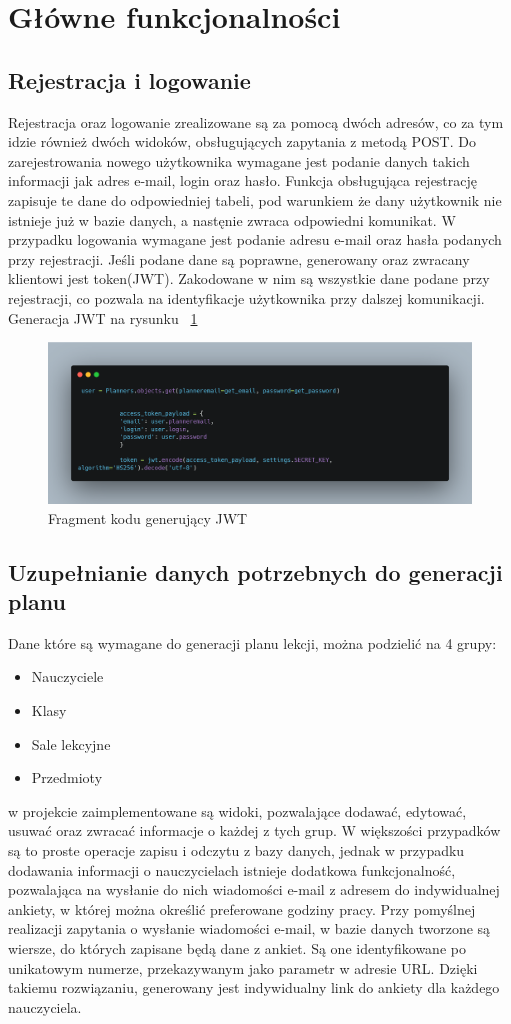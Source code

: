 \section{Główne funkcjonalności}
\subsection{Rejestracja i logowanie}
Rejestracja oraz logowanie zrealizowane są za pomocą dwóch adresów, co za tym idzie również dwóch widoków, obsługujących zapytania z metodą POST. Do zarejestrowania nowego użytkownika wymagane jest podanie danych takich informacji jak adres e-mail, login oraz hasło. Funkcja obsługująca rejestrację zapisuje te dane do odpowiedniej tabeli, pod warunkiem że dany użytkownik nie istnieje już w bazie danych, a nastęnie zwraca odpowiedni komunikat. W przypadku logowania wymagane jest podanie adresu e-mail oraz hasła podanych przy rejestracji. Jeśli podane dane są poprawne, generowany oraz zwracany klientowi jest token(JWT). Zakodowane w nim są wszystkie dane podane przy rejestracji, co pozwala na identyfikacje użytkownika przy dalszej komunikacji. Generacja JWT na rysunku ~\ref{rys:jwt} 
\begin{figure}[H]
	\centering\includegraphics[width=\textwidth]{figures/jwt}
	\caption{Fragment kodu generujący JWT}\label{rys:jwt}
\end{figure}
\subsection{Uzupełnianie danych potrzebnych do generacji planu}
Dane które są wymagane do generacji planu lekcji, można podzielić na 4 grupy:
\begin{itemize}
	\item Nauczyciele
	\item Klasy
	\item Sale lekcyjne
	\item Przedmioty
\end{itemize}
w projekcie zaimplementowane są widoki, pozwalające dodawać, edytować, usuwać oraz zwracać informacje o każdej z tych grup. W większości przypadków są to proste operacje zapisu i odczytu z bazy danych, jednak w przypadku dodawania informacji o nauczycielach istnieje dodatkowa funkcjonalność, pozwalająca na wysłanie do nich wiadomości e-mail z adresem do indywidualnej ankiety, w której można określić preferowane godziny pracy. Przy pomyślnej realizacji zapytania o wysłanie wiadomości e-mail, w bazie danych tworzone są wiersze, do których zapisane będą dane z ankiet. Są one identyfikowane po unikatowym numerze, przekazywanym jako parametr w adresie URL. Dzięki takiemu rozwiązaniu, generowany jest indywidualny link do ankiety dla każdego nauczyciela.
